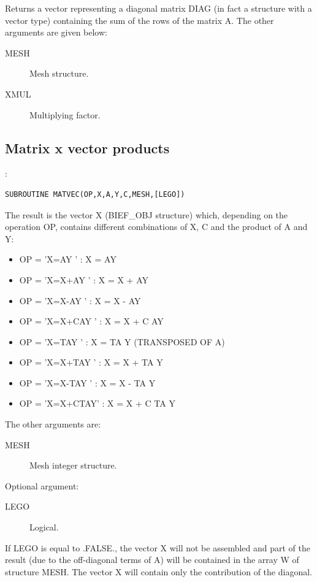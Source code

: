 Returns a vector representing a diagonal matrix DIAG (in fact a
 structure with a vector type) containing the sum of the rows
of the matrix A.  The other arguments are given below:

\begin{description}
  \item [MESH] Mesh structure.
  \item [XMUL] Multiplying factor.
\end{description}

\subsection{Matrix x vector products}

:
\begin{lstlisting}[language=TelFortran]
SUBROUTINE MATVEC(OP,X,A,Y,C,MESH,[LEGO])
\end{lstlisting}

The result is the vector X (BIEF\_OBJ structure) which, depending on the
operation OP, contains different combinations of X, C and the product of A and
Y:
\begin{itemize}
  \item OP = 'X=AY    '  : X = AY
  \item OP = 'X=X+AY  '  : X = X + AY
  \item OP = 'X=X-AY  '  : X = X - AY
  \item OP = 'X=X+CAY '  : X = X + C AY
  \item OP = 'X=TAY   '  : X = TA Y (TRANSPOSED OF A)
  \item OP = 'X=X+TAY '  : X = X + TA Y
  \item OP = 'X=X-TAY '  : X = X - TA Y
  \item OP = 'X=X+CTAY'  : X = X + C TA Y
\end{itemize}

The other arguments are:
\begin{description}
  \item [MESH] Mesh integer structure.
\end{description}

Optional argument:
\begin{description}
  \item [LEGO] Logical.
\end{description}

If LEGO is equal to .FALSE., the vector X will not be assembled and part of the
result (due to the off-diagonal terms of A) will be contained in the array W of
structure MESH. The vector X will contain only the contribution of the
diagonal.

